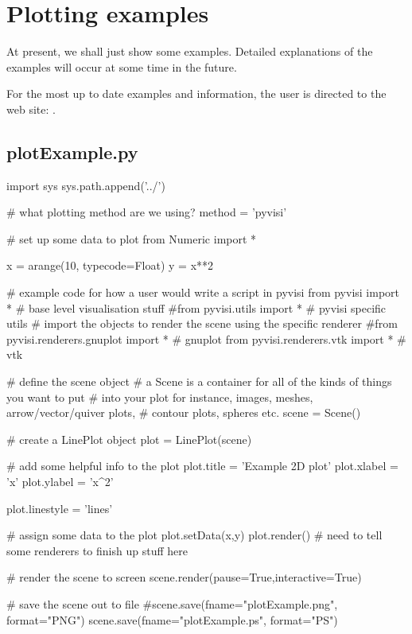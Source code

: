 
\chapter{Plotting examples}

At present, we shall just show some examples.  Detailed explanations of the
examples will occur at some time in the future.

For the most up to date examples and information, the user is directed to
the \pyvisi web site:
.

\section{plotExample.py}

\begin{pythonCode}
import sys
sys.path.append('../')

# what plotting method are we using?
method = 'pyvisi'

# set up some data to plot
from Numeric import *

x = arange(10, typecode=Float)
y = x**2

# example code for how a user would write a script in pyvisi
from pyvisi import *          # base level visualisation stuff
#from pyvisi.utils import *   # pyvisi specific utils
# import the objects to render the scene using the specific renderer
#from pyvisi.renderers.gnuplot import *   # gnuplot
from pyvisi.renderers.vtk import *       # vtk
   
# define the scene object
# a Scene is a container for all of the kinds of things you want to put 
# into your plot for instance, images, meshes, arrow/vector/quiver plots, 
# contour plots, spheres etc.
scene = Scene()
    
# create a LinePlot object
plot = LinePlot(scene)
    
# add some helpful info to the plot
plot.title = 'Example 2D plot'
plot.xlabel = 'x'
plot.ylabel = 'x^2'

plot.linestyle = 'lines'
    
# assign some data to the plot
plot.setData(x,y)
plot.render()  # need to tell some renderers to finish up stuff here

# render the scene to screen
scene.render(pause=True,interactive=True)

# save the scene out to file
#scene.save(fname="plotExample.png", format="PNG")
scene.save(fname="plotExample.ps", format="PS")
\end{pythonCode}

